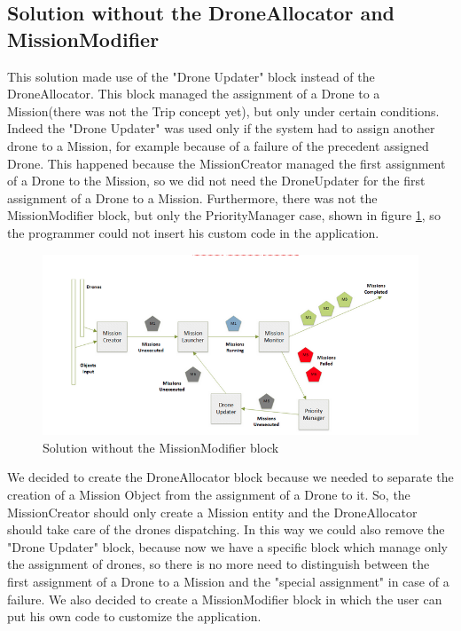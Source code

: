\subsection{Solution without the DroneAllocator and MissionModifier}

This solution made use of the "Drone Updater" block instead of the DroneAllocator. 
This block managed the assignment of a Drone to a Mission(there was not the Trip concept yet), but only under certain conditions.
Indeed the "Drone Updater" was used only if the system had to assign another drone to a Mission, for example because of a failure of the precedent assigned Drone.
This happened because the MissionCreator managed the first assignment of a Drone to the Mission, so we did not need the DroneUpdater for the first assignment of a Drone to a Mission.
Furthermore, there was not the MissionModifier block, but only the PriorityManager case, shown in figure \ref{fig:noMM}, so the programmer could not insert his custom code in the application.


\begin{figure}[h!]
  \centering
  \includegraphics[width=\linewidth]{pictures/NoMM.png}
  \caption{Solution without the MissionModifier block}
  \label{fig:noMM}
\end{figure}

We decided to create the DroneAllocator block because we needed to separate the creation of a Mission Object from the assignment of a Drone to it.
So, the MissionCreator should only create a Mission entity and the DroneAllocator should take care of the drones dispatching.
In this way we could also remove the "Drone Updater" block, because now we have a specific block which manage only the assignment of drones, so there is no more need to distinguish between the first assignment of a Drone to a Mission and the "special assignment" in case of a failure.
We also decided to create a MissionModifier block in which the user can put his own code to customize the application.